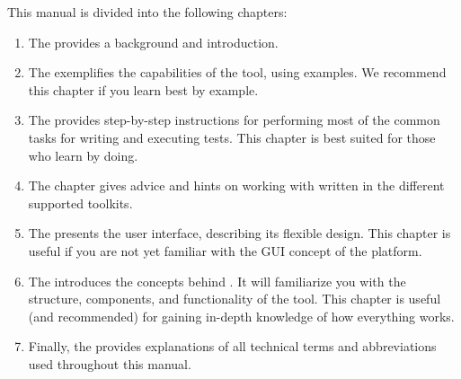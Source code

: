 This manual is divided into the following chapters:

\begin{enumerate}
\item The  provides a background and introduction.

\item The   exemplifies the capabilities of the tool, using  \gdproject{} examples.
We recommend this chapter if you learn best by example. 

\item The  provides step-by-step instructions for performing most of the common tasks for writing and executing tests.
This chapter is best suited for those who learn by doing.

\item The  chapter  gives advice and hints on working with \gdauts{} written in the different supported toolkits.

\item The  presents the user interface, describing its flexible design.
This chapter is useful if you are not yet familiar  with the GUI concept of the  platform.

\item The  introduces the concepts behind
  \app{}. It will familiarize you with the structure, components, and functionality of the tool. This chapter is useful (and recommended) for gaining in-depth knowledge of how everything works.


\item Finally, the  provides explanations of all
technical terms and abbreviations used throughout this manual.
\end{enumerate}
